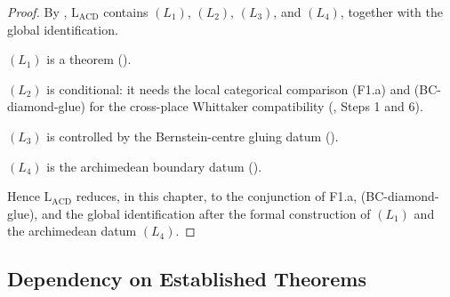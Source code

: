 \begin{proof}
By ,
\(\mathrm{L}_{\mathrm{ACD}}\) contains
\((L_{1})\), \((L_{2})\), \((L_{3})\), and \((L_{4})\), together with
the global identification.

\((L_{1})\) is a theorem ().

\((L_{2})\) is conditional: it needs the local categorical
comparison (F1.a) and (BC-diamond-glue) for the cross-place
Whittaker compatibility
(, Steps 1 and 6).

\((L_{3})\) is controlled by the Bernstein-centre gluing datum
().

\((L_{4})\) is the archimedean boundary datum
().

Hence \(\mathrm{L}_{\mathrm{ACD}}\) reduces, in this chapter, to the
conjunction of F1.a, (BC-diamond-glue), and the global identification
after the formal construction of \((L_{1})\) and the archimedean datum
\((L_{4})\).
\end{proof}

\subsection{Dependency on Established Theorems}

